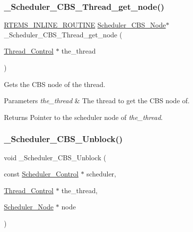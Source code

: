 \subsubsection{\texorpdfstring{\_Scheduler\_CBS\_Thread\_get\_node()}{\_Scheduler\_CBS\_Thread\_get\_node()}}
{\footnotesize\ttfamily \mbox{\hyperlink{group__RTEMSScoreBaseDefs_gac216239df231d5dbd15e3520b0b9313f}{R\+T\+E\+M\+S\+\_\+\+I\+N\+L\+I\+N\+E\+\_\+\+R\+O\+U\+T\+I\+NE}} \mbox{\hyperlink{structScheduler__CBS__Node}{Scheduler\+\_\+\+C\+B\+S\+\_\+\+Node}}$\ast$ \+\_\+\+Scheduler\+\_\+\+C\+B\+S\+\_\+\+Thread\+\_\+get\+\_\+node (\begin{DoxyParamCaption}\item[{\mbox{\hyperlink{struct__Thread__Control}{Thread\+\_\+\+Control}} $\ast$}]{the\+\_\+thread }\end{DoxyParamCaption})}



Gets the C\+BS node of the thread. 


\begin{DoxyParams}{Parameters}
{\em the\+\_\+thread} & The thread to get the C\+BS node of.\\
\hline
\end{DoxyParams}
\begin{DoxyReturn}{Returns}
Pointer to the scheduler node of {\itshape the\+\_\+thread}. 
\end{DoxyReturn}
\mbox{\label{group__RTEMSScoreSchedulerCBS_gae0d9c2720ee46efdfe87ebf87cd45cae}} 
\subsubsection{\texorpdfstring{\_Scheduler\_CBS\_Unblock()}{\_Scheduler\_CBS\_Unblock()}}
{\footnotesize\ttfamily void \+\_\+\+Scheduler\+\_\+\+C\+B\+S\+\_\+\+Unblock (\begin{DoxyParamCaption}\item[{const \mbox{\hyperlink{struct__Scheduler__Control}{Scheduler\+\_\+\+Control}} $\ast$}]{scheduler,  }\item[{\mbox{\hyperlink{struct__Thread__Control}{Thread\+\_\+\+Control}} $\ast$}]{the\+\_\+thread,  }\item[{\mbox{\hyperlink{structScheduler__Node}{Scheduler\+\_\+\+Node}} $\ast$}]{node }\end{DoxyParamCaption})}



